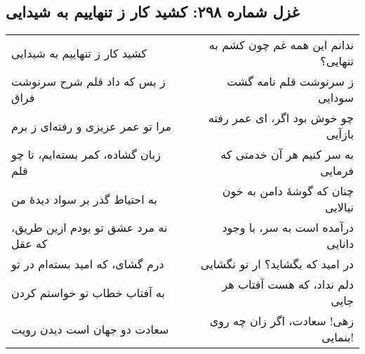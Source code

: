 \begin{center}
\section*{غزل شماره ۲۹۸: کشید کار ز تنهاییم به شیدایی}
\label{sec:298}
\begin{longtable}{l p{0.5cm} r}
کشید کار ز تنهاییم به شیدایی
&&
ندانم این همه غم چون کشم به تنهایی؟
\\
ز بس که داد قلم شرح سرنوشت فراق
&&
ز سرنوشت قلم نامه گشت سودایی
\\
مرا تو عمر عزیزی و رفته‌ای ز برم
&&
چو خوش بود اگر، ای عمر رفته بازآیی
\\
زبان گشاده، کمر بسته‌ایم، تا چو قلم
&&
به سر کنیم هر آن خدمتی که فرمایی
\\
به احتیاط گذر بر سواد دیدهٔ من
&&
چنان که گوشهٔ دامن به خون نیالایی
\\
نه مرد عشق تو بودم ازین طریق، که عقل
&&
درآمده است به سر، با وجود دانایی
\\
درم گشای، که امید بسته‌ام در تو
&&
در امید که بگشاید؟ ار تو نگشایی
\\
به آفتاب خطاب تو خواستم کردن
&&
دلم نداد، که هست آفتاب هر جایی
\\
سعادت دو جهان است دیدن رویت
&&
زهی! سعادت، اگر زان چه روی بنمایی!
\\
\end{longtable}
\end{center}
